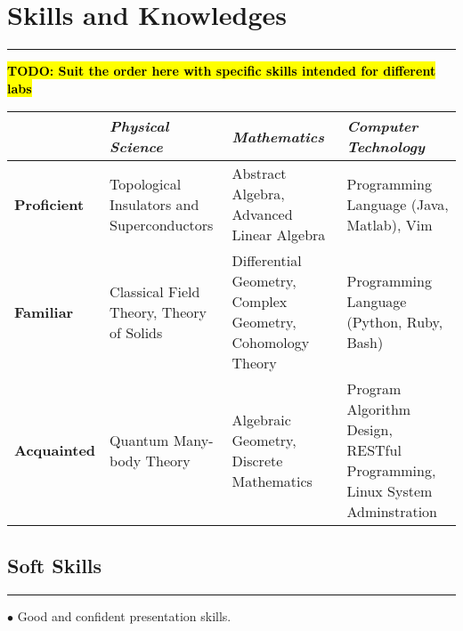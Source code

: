 \documentclass[letterpaper]{article}
\renewenvironment{itemize}{
  \begin{list}{}{
    \setlength{\leftmargin}{.5em}
  }
}{
  \end{list}
}
\begin{document}
\section*{Skills and Knowledges}
\vspace{-8pt}
\hrule height .7pt
\hl{\textbf{TODO: Suit the order here with specific skills intended for
different labs}}
\begin{table}[h]
    \centering
    \tabulinesep=1.2mm
    \begin{tabu}{  l X[l] X[l] X[l]  }
        &  \textit{Physical Science} & \textit{Mathematics} &
        \textit{Computer Technology} \\
    \hline
    \textbf{Proficient} & Topological Insulators and Superconductors &
        Abstract Algebra, Advanced Linear Algebra & Programming
        Language (Java, Matlab), Vim \\

    \textbf{Familiar} & Classical Field Theory, Theory of Solids &
        Differential Geometry, Complex Geometry, Cohomology Theory &
        Programming Language (Python, Ruby, Bash) \\

    \textbf{Acquainted} & Quantum Many-body Theory & Algebraic
        Geometry, Discrete Mathematics & Program Algorithm Design,
        RESTful Programming, Linux System Adminstration\\
    \bottomrule
    \end{tabu}
\end{table}
\subsection*{Soft Skills}
\vspace{-5pt}
\hrule height .4pt
\smallskip
\begin{itemize}
    \item $\bullet$ Good and confident presentation skills.
\end{itemize}
\end{document}
